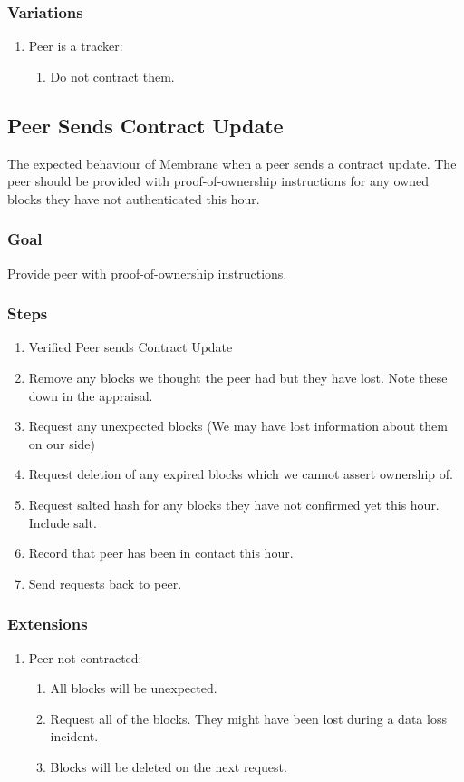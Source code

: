 \documentclass[11pt, a4paper, twocolumn, twoside]{report}
\begin{document}
\subsubsection{Variations}
\begin{enumerate}
  \item Peer is a tracker:
	\begin{enumerate}
	  \item Do not contract them.
	\end{enumerate}
\end{enumerate}

\subsection{Peer Sends Contract Update}

The expected behaviour of Membrane when a peer sends a contract update. The peer should be provided with proof-of-ownership instructions for any owned blocks they have not authenticated this hour.

\subsubsection{Goal}

Provide peer with proof-of-ownership instructions.

\subsubsection{Steps}

\begin{enumerate}
 \item Verified Peer sends Contract Update
 \item Remove any blocks we thought the peer had but they have lost. Note these down in the appraisal.
 \item Request any unexpected blocks (We may have lost information about them on our side)
 \item Request deletion of any expired blocks which we cannot assert ownership of.
 \item Request salted hash for any blocks they have not confirmed yet this hour. Include salt.
 \item Record that peer has been in contact this hour.
 \item Send requests back to peer.
\end{enumerate}

\subsubsection{Extensions}
\begin{enumerate}
  \item Peer not contracted:
	\begin{enumerate}
	  \item All blocks will be unexpected.
	  \item Request all of the blocks. They might have been lost during a data loss incident.
	  \item Blocks will be deleted on the next request.
	\end{enumerate}
\end{enumerate}
\end{document}

